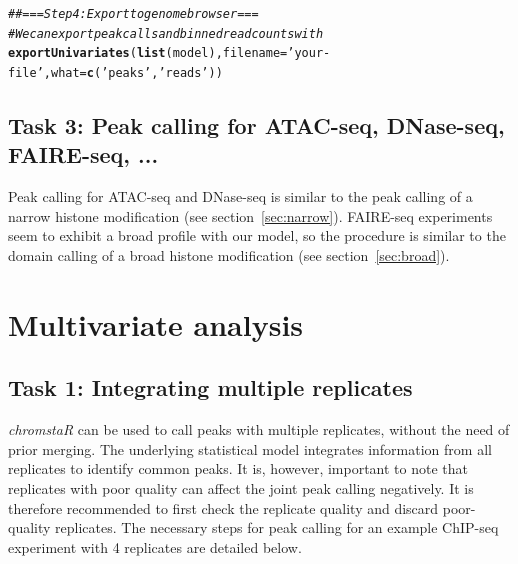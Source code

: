 \documentclass[11pt]{article}\usepackage[]{graphicx}\usepackage[]{color}
\makeatletter
\newcommand{\hlstr}[1]{\textcolor[rgb]{0.192,0.494,0.8}{#1}}%
\newcommand{\hlcom}[1]{\textcolor[rgb]{0.678,0.584,0.686}{\textit{#1}}}%
\newcommand{\hlstd}[1]{\textcolor[rgb]{0.345,0.345,0.345}{#1}}%
\newcommand{\hlkwc}[1]{\textcolor[rgb]{0.333,0.667,0.333}{#1}}%
\newcommand{\hlkwd}[1]{\textcolor[rgb]{0.737,0.353,0.396}{\textbf{#1}}}%
\newenvironment{kframe}{%
 \def\at@end@of@kframe{}%
 \ifinner\ifhmode%
  \def\at@end@of@kframe{\end{minipage}}%
  \begin{minipage}{\columnwidth}%
 \fi\fi%
 \def\FrameCommand##1{\hskip\@totalleftmargin \hskip-\fboxsep
 \colorbox{shadecolor}{##1}\hskip-\fboxsep
     \hskip-\linewidth \hskip-\@totalleftmargin \hskip\columnwidth}%
 \MakeFramed {\advance\hsize-\width
   \@totalleftmargin\z@ \linewidth\hsize
   \@setminipage}}%
 {\par\unskip\endMakeFramed%
 \at@end@of@kframe}
\newenvironment{knitrout}{}{} %
\newcommand{\Rpackage}[1]{{\textit{#1}}}
\makeatother
\begin{document}
\begin{scriptsize}
\begin{knitrout}
\end{knitrout}

\begin{knitrout}
\color{fgcolor}\begin{kframe}
\begin{alltt}
\hlcom{## === Step 4: Export to genome browser ===}
\hlcom{# We can export peak calls and binned read counts with}
\hlkwd{exportUnivariates}\hlstd{(}\hlkwd{list}\hlstd{(model),} \hlkwc{filename}\hlstd{=}\hlstr{'your-file'}\hlstd{,} \hlkwc{what}\hlstd{=}\hlkwd{c}\hlstd{(}\hlstr{'peaks'}\hlstd{,}\hlstr{'reads'}\hlstd{))}
\end{alltt}
\end{kframe}
\end{knitrout}
\end{scriptsize}

\subsection{Task 3: Peak calling for ATAC-seq, DNase-seq, FAIRE-seq, ...}

Peak calling for ATAC-seq and DNase-seq is similar to the peak calling of a narrow histone modification (see section~\ref{sec:narrow}). FAIRE-seq experiments seem to exhibit a broad profile with our model, so the procedure is similar to the domain calling of a broad histone modification (see section~\ref{sec:broad}).

\section{Multivariate analysis}
\subsection{Task 1: Integrating multiple replicates}

\Rpackage{chromstaR} can be used to call peaks with multiple replicates, without the need of prior merging. The underlying statistical model integrates information from all replicates to identify common peaks. It is, however, important to note that replicates with poor quality can affect the joint peak calling negatively. It is therefore recommended to first check the replicate quality and discard poor-quality replicates. The necessary steps for peak calling for an example ChIP-seq experiment with 4 replicates are detailed below.
\end{document}
